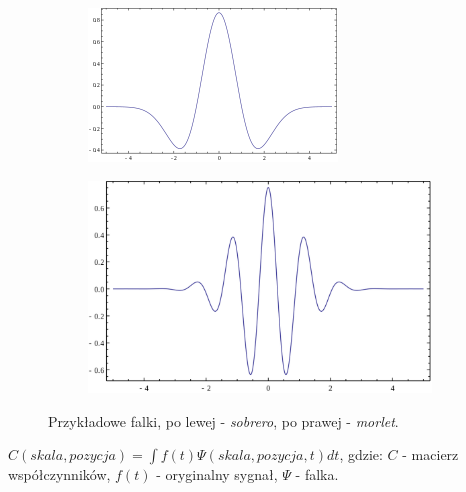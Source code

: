 \begin{figure} [H]
	\centering
	\begin{subfigure}{.48\textwidth}
		\centering
		\includegraphics[width=1.0\linewidth]{EDMIIssues/Figures/sombrero.png}
	\end{subfigure}
	\begin{subfigure}{.48\textwidth}
		\centering
		\includegraphics[width=1.0\linewidth]{EDMIIssues/Figures/morlet.png}
	\end{subfigure}
	\caption{Przykładowe falki, po lewej - \textit{sobrero}, po prawej - \textit{morlet}.}
	\label{wavelets}
\end{figure}

$ C(skala, pozycja) = \int f(t) \Psi(skala, pozycja, t) dt $, gdzie: \newline
$ C $ - macierz współczynników, \newline
$ f(t) $ - oryginalny sygnał, \newline
$ \Psi $ - falka.

